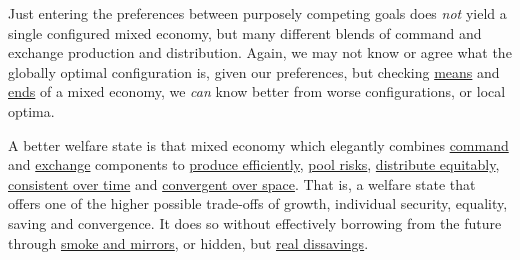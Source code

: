 Just entering the preferences between purposely competing goals does \emph{not} yield a single configured mixed economy, but many different blends of command and exchange production and distribution.
Again, we may not know or agree what the globally optimal configuration is, given our preferences, but checking \hyperref[sec:means]{means} and \hyperref[sec:ends]{ends} of a mixed economy, we \emph{can} know better from worse configurations, or local optima.

A better welfare state is that mixed economy which elegantly combines \hyperref[sec:command]{command} and \hyperref[sec:exchange]{exchange} components to \hyperref[sec:production]{produce efficiently}, \hyperref[sec:risk]{pool risks}, \hyperref[sec:distribution]{distribute equitably}, \hyperref[sec:time]{consistent over time} and \hyperref[sec:space]{convergent over space}.
That is, a welfare state that offers one of the higher possible trade-offs of growth, individual security, equality, saving and convergence.
It does so without effectively borrowing from the future through \hyperref[sec:smoke-n-mirrors]{smoke and mirrors}, or hidden, but \hyperref[sec:real-dissavings]{real dissavings}.


